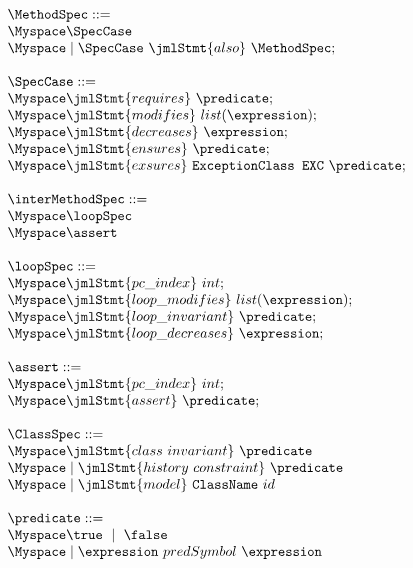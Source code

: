 \begin{figure}[!htbp]
$$ \begin{array}{l}
\MethodSpec  ::= \\
   \Myspace \SpecCase \\
   \Myspace  \mid  \SpecCase \  \jmlStmt{also} \  \MethodSpec	;\\
   \\
\SpecCase ::= \\ 
    \Myspace \jmlStmt{requires} \ \predicate;\\ 
	\Myspace \jmlStmt{modifies} \ list(\expression);\\
	\Myspace \jmlStmt{decreases} \ \expression;\\
    \Myspace \jmlStmt{ensures} \ \predicate;\\
    \Myspace \jmlStmt{exsures} \ \texttt{ExceptionClass EXC} \ \predicate;\\
                     \\
\interMethodSpec ::= \\
     \Myspace \loopSpec \\
	 \Myspace  \assert \\
	  \\
\loopSpec ::= \\
		\Myspace \jmlStmt{pc\_ index} \ int;\\
	    \Myspace \jmlStmt{loop\_modifies} \ list(\expression);\\
       \Myspace \jmlStmt{loop\_invariant}  \ \predicate; \\
	   \Myspace \jmlStmt{loop\_decreases} \ \expression; \\
	 \\								
\assert   ::= \\
		\Myspace \jmlStmt{pc\_ index} \ int;\\
		\Myspace \jmlStmt{assert} \ \predicate; \\
	\\
\ClassSpec ::= \\ 
     \Myspace \jmlStmt{class \ invariant} \ \predicate \\
     \Myspace  \mid  \jmlStmt{history \ constraint} \ \predicate \\
     \Myspace  \mid  \jmlStmt{model} \ \texttt{ClassName}  \ id \\
      \\
      \predicate ::= \\
      \Myspace    \true \ \mid \ \false \\
      \Myspace  \mid   \expression \ predSymbol \ \expression \\

\end{array}$$
\end{figure}
